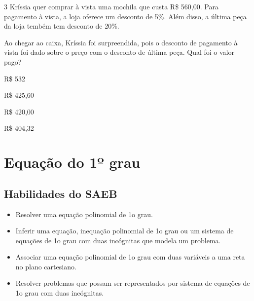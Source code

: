 \num{3} Kríssia quer comprar à vista uma mochila que custa R\$ 560,00. 
Para pagamento à vista, a loja oferece um desconto de 5\%. Além disso, 
a última peça da loja tembém tem desconto de 20\%.

Ao chegar ao caixa, Kríssia foi surpreendida, pois o desconto de
pagamento à vista foi dado sobre o preço com o desconto de
última peça. Qual foi o valor pago?

\begin{escolha}
\item R\$ 532
\item R\$ 425,60
\item R\$ 420,00
\item R\$ 404,32
\end{escolha}

\chapter{Equação do 1º grau}

\section*{Habilidades do SAEB}

\begin{itemize}
  \item Resolver uma equação polinomial de 1o grau.
  \item Inferir uma equação, inequação polinomial de 1o grau ou um sistema de
equações de 1o grau com duas incógnitas que modela um problema.
  \item Associar uma equação polinomial de 1o grau com duas variáveis a uma
reta no plano cartesiano.
  \item Resolver problemas que possam ser representados por sistema de
equações de 1o grau com duas incógnitas. 
\end{itemize} 

